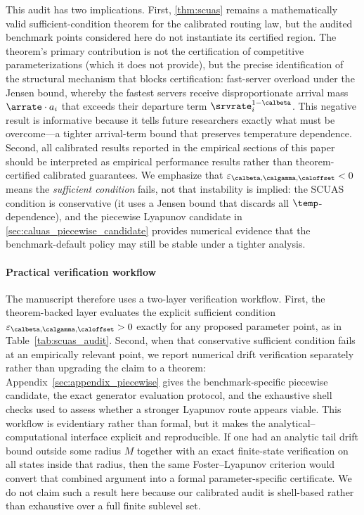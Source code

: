 This audit has two implications.
First, \cref{thm:scuas} remains a mathematically valid sufficient-condition theorem for the calibrated routing law, but the audited benchmark points considered here do not instantiate its certified region. The theorem's primary contribution is not the certification of competitive parameterizations (which it does not provide), but the precise identification of the structural mechanism that blocks certification: fast-server overload under the Jensen bound, whereby the fastest servers receive disproportionate arrival mass $\arrate \cdot a_i$ that exceeds their departure term $\srvrate_i^{1-\calbeta}$. This negative result is informative because it tells future researchers exactly what must be overcome---a tighter arrival-term bound that preserves temperature dependence.
Second, all calibrated results reported in the empirical sections of this paper should be interpreted as empirical performance results rather than theorem-certified calibrated guarantees.
We emphasize that $\varepsilon_{\calbeta,\calgamma,\caloffset} < 0$ means the \emph{sufficient condition} fails, not that instability is implied: the SCUAS condition is conservative (it uses a Jensen bound that discards all $\temp$-dependence), and the piecewise Lyapunov candidate in \cref{sec:caluas_piecewise_candidate} provides numerical evidence that the benchmark-default policy may still be stable under a tighter analysis.

\paragraph{Practical verification workflow}
The manuscript therefore uses a two-layer verification workflow. First, the theorem-backed layer evaluates the explicit sufficient condition $\varepsilon_{\calbeta,\calgamma,\caloffset}>0$ exactly for any proposed parameter point, as in Table~\ref{tab:scuas_audit}. Second, when that conservative sufficient condition fails at an empirically relevant point, we report numerical drift verification separately rather than upgrading the claim to a theorem: Appendix~\ref{sec:appendix_piecewise} gives the benchmark-specific piecewise candidate, the exact generator evaluation protocol, and the exhaustive shell checks used to assess whether a stronger Lyapunov route appears viable. This workflow is evidentiary rather than formal, but it makes the analytical--computational interface explicit and reproducible.
If one had an analytic tail drift bound outside some radius $M$ together with an exact finite-state verification on all states inside that radius, then the same Foster--Lyapunov criterion would convert that combined argument into a formal parameter-specific certificate. We do not claim such a result here because our calibrated audit is shell-based rather than exhaustive over a full finite sublevel set.

